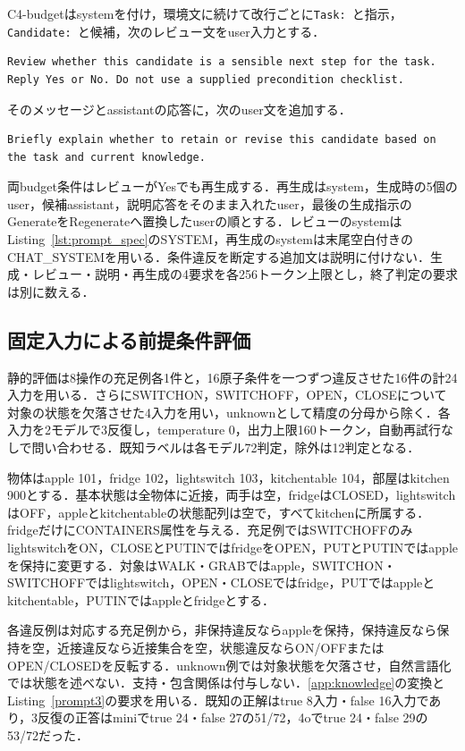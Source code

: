 C4-budgetはsystemを付け，環境文に続けて改行ごとに\texttt{Task: }と指示，\texttt{Candidate: }と候補，次のレビュー文をuser入力とする．
\begin{lstlisting}[basicstyle=\ttfamily\scriptsize,columns=fullflexible]
Review whether this candidate is a sensible next step for the task. Reply Yes or No. Do not use a supplied precondition checklist.
\end{lstlisting}
そのメッセージとassistantの応答に，次のuser文を追加する．
\begin{lstlisting}[basicstyle=\ttfamily\scriptsize,columns=fullflexible]
Briefly explain whether to retain or revise this candidate based on the task and current knowledge.
\end{lstlisting}
両budget条件はレビューがYesでも再生成する．再生成はsystem，生成時の5個のuser，候補assistant，説明応答をそのまま入れたuser，最後の生成指示のGenerateをRegenerateへ置換したuserの順とする．レビューのsystemはListing~\ref{lst:prompt_spec}のSYSTEM，再生成のsystemは末尾空白付きのCHAT\_SYSTEMを用いる．条件違反を断定する追加文は説明に付けない．生成・レビュー・説明・再生成の4要求を各256トークン上限とし，終了判定の要求は別に数える．

\subsection{固定入力による前提条件評価}\label{app:static_conditions}
静的評価は8操作の充足例各1件と，16原子条件を一つずつ違反させた16件の計24入力を用いる．さらにSWITCHON，SWITCHOFF，OPEN，CLOSEについて対象の状態を欠落させた4入力を用い，unknownとして精度の分母から除く．各入力を2モデルで3反復し，temperature 0，出力上限160トークン，自動再試行なしで問い合わせる．既知ラベルは各モデル72判定，除外は12判定となる．

物体はapple 101，fridge 102，lightswitch 103，kitchentable 104，部屋はkitchen 900とする．基本状態は全物体に近接，両手は空，fridgeはCLOSED，lightswitchはOFF，appleとkitchentableの状態配列は空で，すべてkitchenに所属する．fridgeだけにCONTAINERS属性を与える．充足例ではSWITCHOFFのみlightswitchをON，CLOSEとPUTINではfridgeをOPEN，PUTとPUTINではappleを保持に変更する．対象はWALK・GRABではapple，SWITCHON・SWITCHOFFではlightswitch，OPEN・CLOSEではfridge，PUTではappleとkitchentable，PUTINではappleとfridgeとする．

各違反例は対応する充足例から，非保持違反ならappleを保持，保持違反なら保持を空，近接違反なら近接集合を空，状態違反ならON/OFFまたはOPEN/CLOSEDを反転する．unknown例では対象状態を欠落させ，自然言語化では状態を述べない．支持・包含関係は付与しない．\ref{app:knowledge}の変換とListing~\ref{prompt3}の要求を用いる．既知の正解はtrue 8入力・false 16入力であり，3反復の正答はminiでtrue 24・false 27の51/72，4oでtrue 24・false 29の53/72だった．

